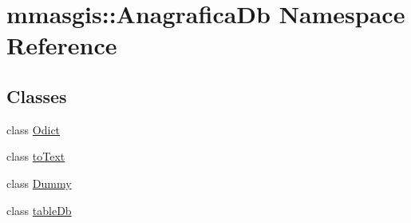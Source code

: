 \hypertarget{namespacemmasgis_1_1AnagraficaDb}{
\section{mmasgis::AnagraficaDb Namespace Reference}
\label{namespacemmasgis_1_1AnagraficaDb}
}
\subsection*{Classes}
\begin{DoxyCompactItemize}
\item 
class \hyperlink{classmmasgis_1_1AnagraficaDb_1_1Odict}{Odict}
\item 
class \hyperlink{classmmasgis_1_1AnagraficaDb_1_1toText}{toText}
\item 
class \hyperlink{classmmasgis_1_1AnagraficaDb_1_1Dummy}{Dummy}
\item 
class \hyperlink{classmmasgis_1_1AnagraficaDb_1_1tableDb}{tableDb}
\end{DoxyCompactItemize}
